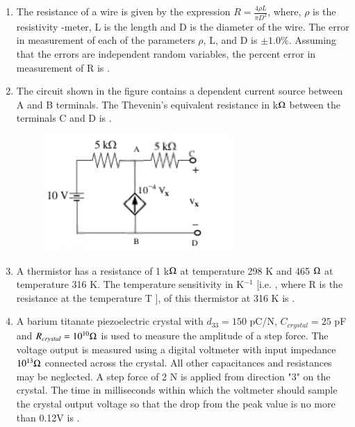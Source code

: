 \documentclass[journal,12pt,onecolumn]{IEEEtran}
\theoremstyle{remark}
\begin{document}
\begin{enumerate}
    \hfill{}
    
    \item The resistance of a wire is given by the expression $R = \frac{4\rho L}{\pi D^2}$, where, $\rho$ is the resistivity \brak{\ohm}-meter, L is the length  and D  is the diameter of the wire. The error in measurement of each of the parameters $\rho$, L, and D is $\pm1.0\%$. Assuming that the errors are independent random variables, the percent error in measurement of R is \underline{\hspace{2cm}}.

    \hfill{}

    
    
    \item The circuit shown in the figure contains a dependent current source between A and B terminals. The Thevenin's equivalent resistance in k$\ohm$ between the terminals C and D is \underline{\hspace{2cm}}.
    \begin{figure}[H]
        \centering
        \includegraphics[width=0.5\columnwidth]{q32}
        \caption*{}
        \label{fig:q32}
    \end{figure}

    \hfill{}
    \item A thermistor has a resistance of 1 k$\ohm$ at temperature 298 K and 465 $\ohm$ at temperature 316 K. The temperature sensitivity in K$^{-1}$ [i.e. , where R is the resistance at the temperature T ], of this thermistor at 316 K is \underline{\hspace{2cm}}.

    \hfill{}

    
    
    \item A barium titanate piezoelectric crystal with $d_{33} = 150$ pC/N, $C_{crystal} = 25$ pF and $R_{crystal} = 10^{10} \ohm$ is used to measure the amplitude of a step force. The voltage output is measured using a digital voltmeter with input impedance $10^{13} \ohm$ connected across the crystal. All other capacitances and resistances may be neglected. A step force of 2 N is applied from direction "3" on the crystal. The time in milliseconds within which the voltmeter should sample the crystal output voltage so that the drop from the peak value is no more than 0.12V is \underline{\hspace{2cm}}.


\end{enumerate}
\end{document}
